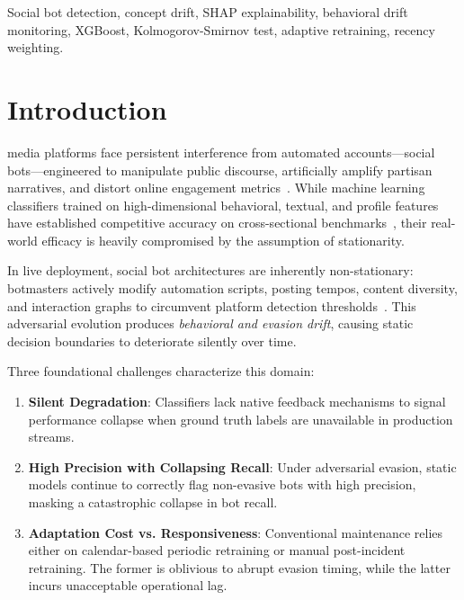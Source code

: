 \documentclass[journal]{IEEEtran}
\begin{document}
\begin{IEEEkeywords}
Social bot detection, concept drift, SHAP explainability, behavioral drift monitoring, XGBoost, Kolmogorov-Smirnov test, adaptive retraining, recency weighting.
\end{IEEEkeywords}

\section{Introduction}
 media platforms face persistent interference from automated accounts---social bots---engineered to manipulate public discourse, artificially amplify partisan narratives, and distort online engagement metrics~\cite{ferrara2016rise,varol2017online}. While machine learning classifiers trained on high-dimensional behavioral, textual, and profile features have established competitive accuracy on cross-sectional benchmarks~\cite{feng2022twibot,cresci2017paradigm}, their real-world efficacy is heavily compromised by the assumption of stationarity. 

In live deployment, social bot architectures are inherently non-stationary: botmasters actively modify automation scripts, posting tempos, content diversity, and interaction graphs to circumvent platform detection thresholds~\cite{cresci2020decade,hays2025bots}. This adversarial evolution produces \textit{behavioral and evasion drift}, causing static decision boundaries to deteriorate silently over time. 

Three foundational challenges characterize this domain:
\begin{enumerate}
    \item \textbf{Silent Degradation}: Classifiers lack native feedback mechanisms to signal performance collapse when ground truth labels are unavailable in production streams.
    \item \textbf{High Precision with Collapsing Recall}: Under adversarial evasion, static models continue to correctly flag non-evasive bots with high precision, masking a catastrophic collapse in bot recall.
    \item \textbf{Adaptation Cost vs. Responsiveness}: Conventional maintenance relies either on calendar-based periodic retraining or manual post-incident retraining. The former is oblivious to abrupt evasion timing, while the latter incurs unacceptable operational lag.
\end{enumerate}
\end{document}
